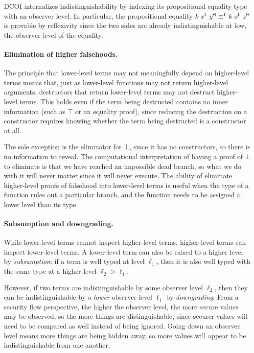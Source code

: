 \documentclass{article}
\newcommand{\HH}{\mathsf{H}}
\newcommand{\LL}{\mathsf{L}}
\begin{document}
DCOI internalizes indistinguishability by indexing
its propositional equality type with an observer level.
In particular, the propositional equality
$k \; x^\LL \; y^\HH \equiv^\LL k \; x^\LL \; z^\HH$
is provable by reflexivity since the two sides are already indistinguishable
at low, the observer level of the equality.

\paragraph{Elimination of higher falsehoods.}
The principle that lower-level terms may not meaningfully depend
on higher-level terms means that,
just as lower-level functions may not return higher-level arguments,
destructors that return lower-level terms may not destruct higher-level terms.
This holds even if the term being destructed contains no inner information
(such as $\top$ or an equality proof),
since reducing the destruction on a constructor requires knowing
whether the term being destructed is a constructor at all.

The sole exception is the eliminator for $\bot$,
since it has no constructors, so there is no information to reveal.
The computational interpretation of having a proof of $\bot$ to eliminate
is that we have reached an impossible dead branch,
so what we do with it will never matter since it will never execute.
The ability of eliminate higher-level proofs of falsehood into lower-level terms
is useful when the type of a function rules out a particular branch,
and the function needs to be assigned a lower level than its type.

\paragraph{Subsumption and downgrading.}
While lower-level terms cannot inspect higher-level terms,
higher-level terms can inspect lower-level terms.
A lower-level term can also be raised to a higher level by \emph{subsumption}:
if a term is well typed at level $\ell_1$,
then it is also well typed with the same type at a higher level $\ell_2 > \ell_1$.

However, if two terms are indistinguishable by some observer level $\ell_2$,
then they can be indistinguishable by a \emph{lower} observer level $\ell_1$ by \emph{downgrading}.
From a security flow perspective, the higher the observer level,
the more secure values may be observed,
so the more things are distinguishable,
since securer values will need to be compared as well instead of being ignored.
Going down an observer level means more things are being hidden away,
so more values will appear to be indistinguishable from one another.
\end{document}
